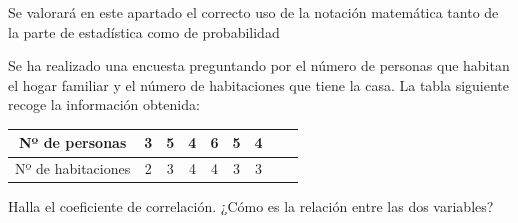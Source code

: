 \documentclass[addpoints,spanish, 12pt,a4paper]{exam}
\begin{document}
\begin{questions}

\question[2] Se valorará en este apartado el correcto uso de la notación matemática tanto de la parte de estadística como de probabilidad

\question[2]  Se ha realizado una encuesta preguntando por el número de personas que habitan el hogar familiar y el número de habitaciones que tiene la casa. La tabla siguiente recoge la información obtenida:

\begin{tabular}{|c||c|c|c|c|c|c|c|c|}
\hline 
Nº de personas & 3 & 5 & 4 & 6 & 5 & 4  \\ 
\hline 
Nº de habitaciones & 2 & 3 & 4 & 4 & 3 & 3 \\ 
\hline 
\end{tabular} 

Halla el coeficiente de correlación. ¿Cómo es la relación entre las dos variables?


\end{questions}
\end{document}

